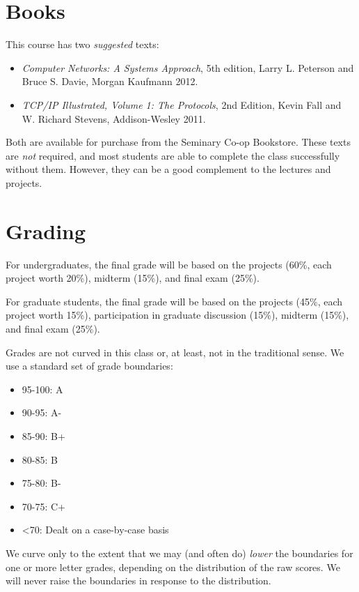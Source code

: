 \documentclass[11pt]{article}
\begin{document}
\section{Books}

This course has two \emph{suggested} texts:

\begin{itemize}
 \item \emph{Computer Networks: A Systems Approach}, 5th edition, Larry L. Peterson and Bruce S. Davie, Morgan Kaufmann 2012.
 \item \emph{TCP/IP Illustrated, Volume 1: The Protocols}, 2nd Edition, Kevin Fall and W. Richard Stevens, Addison-Wesley 2011.
\end{itemize}

Both are available for purchase from the Seminary Co-op Bookstore. These texts are \emph{not} required, and most students are able to complete the class successfully without them. However, they can be a good complement to the lectures and projects.

  
\section{Grading}

For undergraduates, the final grade will be based on the projects (60\%, each project worth 20\%), midterm (15\%), and final exam (25\%).

For graduate students, the final grade will be based on the projects (45\%, each project worth 15\%), participation in graduate discussion (15\%), midterm (15\%), and final exam (25\%).

Grades are not curved in this class or, at least, not in the traditional sense. We use a standard set of grade boundaries:
 
\begin{itemize}
 \item 95-100: A
 \item 90-95: A-
 \item 85-90: B+
 \item 80-85: B
 \item 75-80: B-
 \item 70-75: C+
 \item <70: Dealt on a case-by-case basis
\end{itemize}

We curve only to the extent that we may (and often do) \emph{lower} the boundaries for one or more letter grades, depending on the distribution of the raw scores.  We will never raise the boundaries in response to the distribution.
\end{document}
